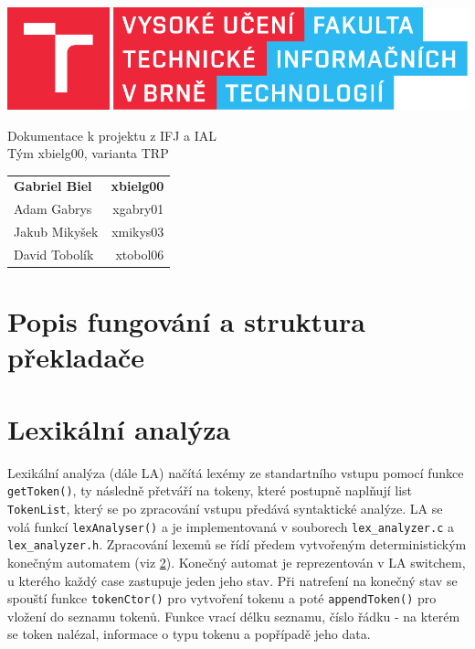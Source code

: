 \documentclass[a4paper, 12pt]{article}
\begin{document}
    \begin{titlepage}
		\centering

        \includegraphics{src/fitlogo.pdf}


        {\Huge Dokumentace k projektu z IFJ a IAL\\[0.4em]
            \LARGE Tým xbielg00, varianta TRP}


        \begin{table}[H]
            \hfill
            \begin{tabularx}{0.5\textwidth}{Xr}
                \textbf{Gabriel Biel} & \textbf{xbielg00} \\
                Adam Gabrys & xgabry01 \\
                Jakub Mikyšek & xmikys03 \\
                David Tobolík & xtobol06 \\
            \end{tabularx}
        \end{table}
	\end{titlepage}

    \tableofcontents
    \newpage

    \section{Popis fungování a struktura překladače}

    \section{Lexikální analýza}
    Lexikální analýza (dále LA) načítá lexémy ze standartního vstupu pomocí funkce \texttt{getToken()}, ty následně přetváří na tokeny, které postupně naplňují list \texttt{TokenList}, který se po zpracování vstupu předává syntaktické analýze. LA se volá funkcí \texttt{lexAnalyser()} a je implementovaná v souborech \texttt{lex\_analyzer.c} a \texttt{lex\_analyzer.h}. Zpracování lexemů se řídí předem vytvořeným deterministickým konečným automatem (viz \ref{}). Konečný automat je reprezentován v LA  switchem, u kterého každý case zastupuje jeden jeho stav. Při natrefení na konečný stav se spouští funkce \texttt{tokenCtor()} pro vytvoření tokenu a poté \texttt{appendToken()} pro vložení do seznamu tokenů. Funkce vrací délku seznamu, číslo řádku - na kterém se token nalézal, informace o typu tokenu a popřípadě jeho data.
    
\end{document}
